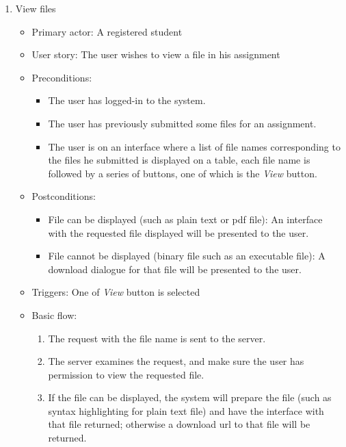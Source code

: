 \begin{enumerate}
\item View files
\begin{itemize}
    \item Primary actor: A registered student
    \item User story: The user wishes to view a file in his assignment
    \item Preconditions:
        \begin{itemize}
            \item The user has logged-in to the system.
            \item The user has previously submitted some files for an
                assignment.
            \item The user is on an interface where a list of file names
                corresponding to the files he submitted is displayed on a table,
                each file name is followed by a series of buttons, one of which
                is the \emph{View} button.
        \end{itemize}
    \item Postconditions:
        \begin{itemize}
            \item File can be displayed (such as plain text or pdf file): 
                An interface with the requested file
                displayed will be presented to the user.
            \item File cannot be displayed (binary file such as an executable
                file): A download dialogue for that file will be presented to
                the user.
        \end{itemize}
    \item Triggers: 
        One of \emph{View} button is selected
    \item Basic flow:
        \begin{enumerate}
            \item The request with the file name is sent to the server.
            \item The server examines the request, and make sure the user
                has permission to view the requested file.
            \item If the file can be displayed, the system will prepare the
                file (such as syntax highlighting for plain text file) and
                have the interface with that file returned; otherwise a download
                url to that file will be returned.
        \end{enumerate}
\end{itemize}
\end{enumerate}


